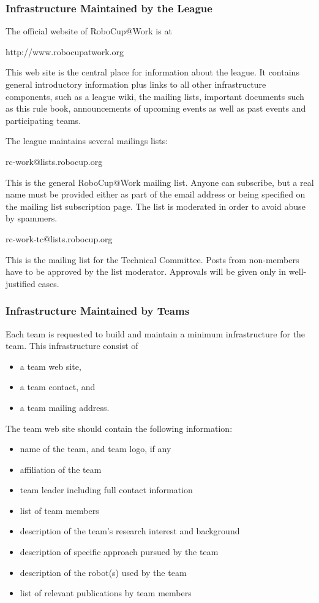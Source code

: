 \subsubsection{Infrastructure Maintained by the League}
The official website of RoboCup@Work is at

http://www.robocupatwork.org

This web site is the central place for information about the league. It contains general introductory information plus links to all other infrastructure components, such as a league wiki, the mailing lists, important documents such as this rule book, announcements of upcoming events as well as past events and participating teams.
\par
The league maintains several mailings lists:
\par
rc-work@lists.robocup.org
\par
This is the general RoboCup@Work mailing list. Anyone can subscribe, but a real name must be provided either as part of the email address or being specified on the mailing list subscription page. The list is moderated in order to avoid abuse by spammers. 
\par
rc-work-tc@lists.robocup.org
\par
This is the mailing list for the Technical Committee. Posts from non-members have to be approved by the list moderator. Approvals will be given only in well-justified cases.

\subsubsection{Infrastructure Maintained by Teams}
Each team is requested to build and maintain a minimum infrastructure for the team. This infrastructure consist of 

\begin{itemize}
	\item a team web site,
	\item a team contact, and
	\item a team mailing address.
\end{itemize}

The team web site should contain the following information:

\begin{itemize}
	\item name of the team, and team logo, if any
	\item affiliation of the team
	\item team leader including full contact information
	\item list of team members
	\item description of the team’s research interest and background
	\item description of specific approach pursued by the team
	\item description of the robot(s) used by the team
	\item list of relevant publications by team members

\end{itemize}

